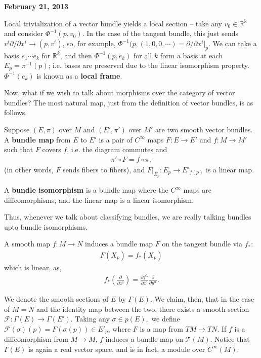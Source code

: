 \documentclass{../mathnotes}
\begin{document}
\textbf{February 21, 2013}

Local trivialization of a vector bundle yields a local section -- take any $v_0\in \mathbb{R^k}$ and consider $\Phi^{-1}(p,v_0)$. In the
case of the tangent bundle, this just sends $v^i\partial/\partial x^i\to (p,v^i)$, so, for example, $\Phi^{-1}(p,(1,0,0,\cdots)=\partial/\partial x^i|_p$.
We can take a basis $e_1\cdots e_k$ for $\mathbb{R}^k$, and then $\Phi^{-1}(p,e_k)$ for all $k$ form a basis at each $E_p=\pi^{-1}(p)$; i.e. bases
are preserved due to the linear isomorphism property. $\Phi^{-1}(e_k)$ is known as a \textbf{local frame}.

Now, what if we wish to talk about morphisms over the category of vector bundles? The most natural map, just from the definition of vector
bundles, is as follows.

\begin{defn}
    Suppose $(E,\pi)$ over $M$ and $(E',\pi')$ over $M'$ are two smooth vector bundles. A \textbf{bundle map} from $E$ to $E'$ is
    a pair of $C^\infty$ maps $F:E\to E'$ and $f:M\to M'$ such that $F$ covers $f$, i.e. the diagram commutes and
    \begin{align*}
        \pi'\circ F=f\circ \pi,
    \end{align*}
    (in other words, $F$ sends fibers to fibers), and $F|_{E_p}:E_p\to E'_{f(p)}$ is a linear map.

    A \textbf{bundle isomorphism} is a bundle map where the $C^\infty$ maps are diffeomorphisms, and the linear map is a linear isomorphism.
\end{defn}
Thus, whenever we talk about classifying bundles, we are really talking bundles upto bundle isomorphisms.

\begin{exmp}
    A smooth map $f:M\to N$ induces a bundle map $F$ on the tangent bundle via $f_*$:
    \begin{align*}
        F(X_p)=f_*(X_p)
    \end{align*}
    which is linear, as,
    \begin{align*}
        f_*\left(\frac{\partial}{\partial x^i}\right)=\frac{\partial f^\lambda}{\partial x^i}\frac{\partial}{\partial y^\alpha}.
    \end{align*}
\end{exmp}

We denote the smooth sections of $E$ by $\Gamma(E)$. We claim, then, that in the case of $M=N$ and the identity map between the two,
there exists a smooth section $\mathcal{F}:\Gamma(E)\to\Gamma(E')$. Taking any $\sigma\in p(E),$ we define $\mathcal{F}(\sigma)(p)=F(\sigma(p))\in E'_p$,
where $F$ is a map from $TM\to TN$.
If $f$ is a diffeomorphism from $M\to M$, $f$ induces a bundle map on $\mathcal{T}(M)$.
Notice that $\Gamma(E)$ is again a real vector space, and is in fact, a module over $C^\infty(M)$.
\end{document}
